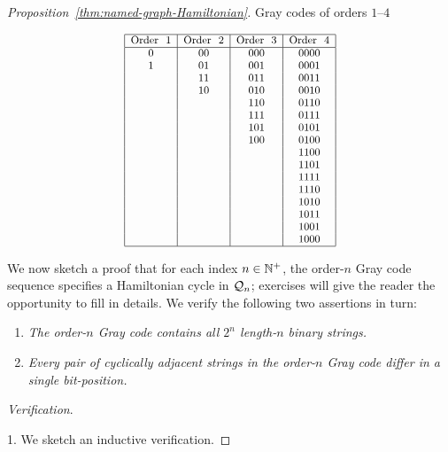 \begin{proof}[Proposition~\ref{thm:named-graph-Hamiltonian}]
\begin{table}
\caption{Gray codes of orders $1$--$4$}
\label{tab:gray-code}
\begin{equation}
 {\small
\begin{array}{|c|c|c|c|}
\hline
\mbox{Order } \ 1
  & \mbox{Order } \ 2
  & \mbox{Order } \ 3
  & \mbox{Order } \ 4 \\
\hline
0   & 00   & 000  &  0000 \\ 
1   & 01   & 001  &  0001 \\
    & 11   & 011  &  0011 \\
    & 10   & 010  &  0010 \\
    &      & 110  &  0110 \\
    &      & 111  &  0111 \\
    &      & 101  &  0101 \\
    &      & 100  &  0100 \\
    &      &      &  1100 \\  
    &      &      &  1101 \\  
    &      &      &  1111 \\  
    &      &      &  1110 \\  
    &      &      &  1010 \\  
    &      &      &  1011 \\  
    &      &      &  1001 \\  
    &      &      &  1000 \\  
\hline
\end{array} }
\end{equation}
\end{table}

We now sketch a proof that for each index $n \in \mathbb{N}^+$, the order-$n$ Gray code sequence specifies a Hamiltonian cycle in $\mbox{$\cal Q$}_n$; exercises will give the reader the opportunity to fill in details.  We verify the following two assertions in turn:
\begin{enumerate}
\item
{\it The order-$n$ Gray code contains all $2^n$ length-$n$ binary strings.}
\medskip\item
{\it Every pair of cyclically adjacent strings in the order-$n$ Gray code differ in a single bit-position.}
\end{enumerate}
{\it Verification}.

 1.
We sketch an inductive verification.

\smallskip


\end{proof}
